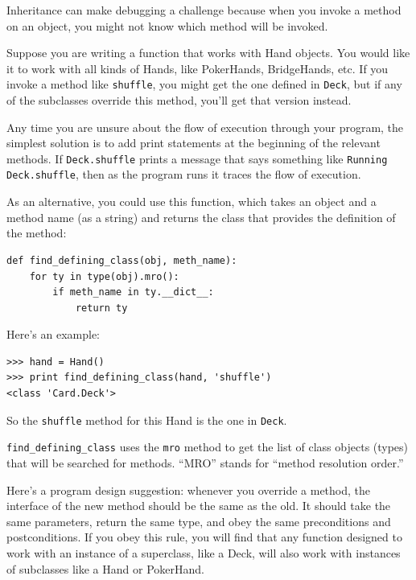 \documentclass[10pt]{book}
\begin{document}
Inheritance can make debugging a challenge because when you
invoke a method on an object, you might not know which method
will be invoked.


Suppose you are writing a function that works with Hand objects.
You would like it to work with all kinds of Hands, like
PokerHands, BridgeHands, etc.  If you invoke a method like
{\tt shuffle}, you might get the one defined in {\tt Deck},
but if any of the subclasses override this method, you'll
get that version instead.  


Any time you are unsure about the flow of execution through your
program, the simplest solution is to add print statements at the
beginning of the relevant methods.  If {\tt Deck.shuffle} prints a
message that says something like {\tt Running Deck.shuffle}, then as
the program runs it traces the flow of execution.

As an alternative, you could use this function, which takes an
object and a method name (as a string) and returns the class that
provides the definition of the method:

\beforeverb
\begin{verbatim}
def find_defining_class(obj, meth_name):
    for ty in type(obj).mro():
        if meth_name in ty.__dict__:
            return ty
\end{verbatim}
\afterverb
%
Here's an example:

\beforeverb
\begin{verbatim}
>>> hand = Hand()
>>> print find_defining_class(hand, 'shuffle')
<class 'Card.Deck'>
\end{verbatim}
\afterverb
%
So the {\tt shuffle} method for this Hand is the one in {\tt Deck}.


\verb"find_defining_class" uses the {\tt mro} method to get the list
of class objects (types) that will be searched for methods.  ``MRO''
stands for ``method resolution order.''


Here's a program design suggestion: whenever you override a method,
the interface of the new method should be the same as the old.  It
should take the same parameters, return the same type, and obey the
same preconditions and postconditions.  If you obey this rule, you
will find that any function designed to work with an instance of a
superclass, like a Deck, will also work with instances of subclasses
like a Hand or PokerHand.
\end{document}
